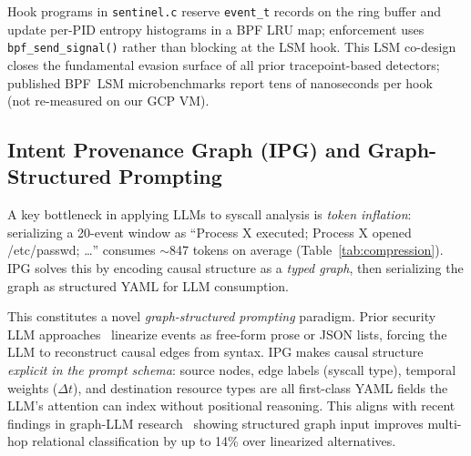 \documentclass[journal]{IEEEtran}
\newcommand{\ipg}{IPG}
\begin{document}
Hook programs in \texttt{sentinel.c} reserve \texttt{event\_t} records on the
ring buffer and update per-PID entropy histograms in a BPF LRU map; enforcement
uses \texttt{bpf\_send\_signal()} rather than blocking at the LSM hook.
This LSM co-design closes the fundamental evasion surface of all prior
tracepoint-based detectors; published BPF~LSM microbenchmarks report tens of
nanoseconds per hook~\cite{bpf_lsm_kernel} (not re-measured on our GCP VM).

\subsection{Intent Provenance Graph (IPG) and Graph-Structured Prompting}
\label{sec:ipg}

A key bottleneck in applying LLMs to syscall analysis is \emph{token
inflation}: serializing a 20-event window as ``Process X executed; Process X
opened /etc/passwd; \ldots'' consumes $\sim$847 tokens on average
(Table~\ref{tab:compression}).  \ipg{} solves this by encoding causal
structure as a \emph{typed graph}, then serializing the graph as structured
YAML for LLM consumption.

This constitutes a novel \emph{graph-structured prompting} paradigm.
Prior security LLM approaches~\cite{llm_provenance_2025,llm_aptds} linearize
events as free-form prose or JSON lists, forcing the LLM to reconstruct causal
edges from syntax.  \ipg{} makes causal structure \emph{explicit in the prompt
schema}: source nodes, edge labels (syscall type), temporal weights
($\Delta t$), and destination resource types are all first-class YAML fields
the LLM's attention can index without positional reasoning.  This aligns with
recent findings in graph-LLM research~\cite{kg_llm_threat} showing structured
graph input improves multi-hop relational classification by up to 14\% over
linearized alternatives.
\end{document}
